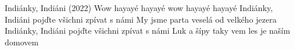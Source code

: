 \begin{TEXT}{Indiánky, Indiáni  (2022)}
\REFREN Wow hayayé hayayé wow hayayé hayayé
\SLOKA* Indiánky, Indiáni\NL
pojďte všichni zpívat s námi
\SLOKA* My jsme parta veselá\NL
od velkého jezera
\REFRENHRAJ
\SLOKA* Indiánky, Indiáni\NL
pojďte všichni zpívat s námi
\SLOKA* Luk a šípy taky vem\NL
les je naším domovem
\REFRENHRAJ
\end{TEXT}
